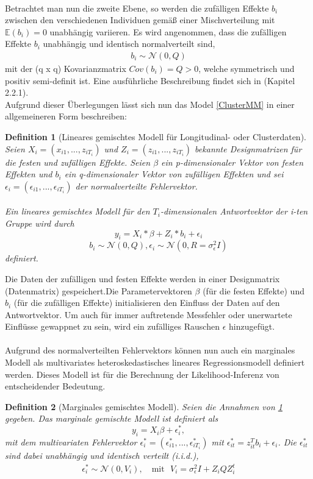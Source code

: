 \documentclass[%
thesis=student,%
coverpage=false,%
titlepage=false,%
headmarks=true, %
german,%
font=libertine, %
math=newpxtx, %
BCOR=5mm,%
coverBCOR=11mm%
]{tumbook}
\theoremstyle{break}
\newtheorem{definition}{Definition}[section]
\begin{document}
\\
Betrachtet man nun die zweite Ebene, so werden die zufälligen Effekte $b_i$ zwischen den verschiedenen Individuen gemäß einer Mischverteilung mit $ \mathbb{E}(b_i)=0$ unabhängig variieren. Es wird angenommen, dass die zufälligen Effekte $b_i$ unabhängig und identisch normalverteilt sind,
\begin{align}
	b_i \sim \mathcal{N}(0,Q)
\end{align}\noindent
mit der (q x q) Kovarianzmatrix $Cov(b_i) = Q > 0$, welche symmetrisch und positiv semi-definit ist. Eine ausführliche Beschreibung findet sich in \cite{pinheiro2000} (Kapitel 2.2.1).
\\
Aufgrund dieser Überlegungen lässt sich nun das Model \ref{ClusterMM} in einer allgemeineren Form beschreiben:
\begin{definition}[Lineares gemischtes Modell für Longitudinal- oder Clusterdaten] \label{LMM für longitudinale Daten}
	Seien $X_i = (x_{i1}, ..., z_{iT_i})$  und $Z_i = (z_{i1},...,z_{iT_i})$ bekannte Designmatrizen für die festen und zufälligen Effekte. Seien $\beta$ ein p-dimensionaler Vektor von festen Effekten und $b_i$ ein q-dimensionaler Vektor von zufälligen Effekten und sei $\epsilon_i = (\epsilon_{i1},...,\epsilon_{iT_i})$ der normalverteilte Fehlervektor.\\
	\\
	Ein lineares gemischtes Modell für den $T_i$-dimensionalen Antwortvektor der i-ten Gruppe wird durch 
	$$y_i = X_i * \beta + Z_i * b_i + \epsilon_i$$ 
	$$b_i \sim \mathcal{N}(0,Q), \epsilon_i \sim \mathcal{N}(0,R = \sigma^2_\epsilon I)$$
	definiert.
\end{definition}\noindent
Die Daten der zufälligen und festen Effekte werden in einer Designmatrix (Datenmatrix) gespeichert.Die Parametervektoren $\beta$ (für die festen Effekte) und $b_i$ (für die zufälligen Effekte) initialisieren den Einfluss der Daten auf den Antwortvektor. Um auch für immer auftretende Messfehler oder unerwartete Einflüsse gewappnet zu sein, wird ein zufälliges Rauschen $\epsilon$ hinzugefügt.\\
\\
Aufgrund des normalverteilten Fehlervektors können nun auch ein marginales Modell als multivariates heteroskedastisches lineares Regressionsmodell definiert werden. Dieses Modell ist für die Berechnung der Likelihood-Inferenz von entscheidender Bedeutung. 
\begin{definition}[Marginales gemischtes Modell]
	Seien die Annahmen von \ref{LMM für longitudinale Daten} gegeben. 
	Das marginale gemischte Modell ist definiert als
	$$ y_i = X_i\beta + \epsilon_i^*,$$
	mit dem multivariaten Fehlervektor $\epsilon_i^* = (\epsilon_{i1}^*,...,\epsilon_{iT_i}^*) $ mit $\epsilon_{it}^* = z_{it}^Tb_i + \epsilon_i$. 
	Die $\epsilon_{it}^*$ sind dabei unabhängig und identisch verteilt (i.i.d.),
	\begin{align}
		\epsilon_i^* \sim \mathcal{N}(0,V_i), \hspace{12pt}\text{mit} \hspace{8pt}V_i = \sigma_\epsilon^2I + Z_i Q Z_i^t 
	\end{align}
\end{definition} \noindent
\end{document}
